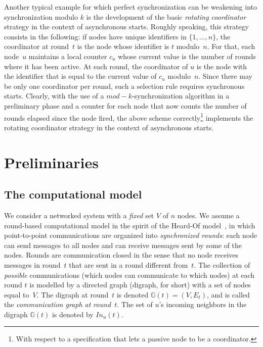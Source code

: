 \documentclass[11pt,letterpaper]{article}
\begin{document}
Another typical example for which perfect synchronization can be weakening into synchronization modulo $k$ is
	the development of the basic \emph{rotating coordinator} strategy in the context of asynchronous starts.
Roughly speaking, this strategy consists in the following: if nodes have unique identifiers in $\{1,\dots,n\}$,
	the coordinator at round~$t$ is the node whose identifier is  $t$ modulo~$n$.
For that, 	 each node~$u$ maintains a local counter $c_u$
	whose current value is the number of rounds where it has been active.
At each round, the  coordinator of $u$ is the  node with the identifier that is equal to the current value of $c_u$ modulo~$n$.
Since there may be only one coordinator per round, such a selection rule requires synchronous starts.
Clearly, with the use of a $mod-k$-synchronization algorithm in a preliminary phase and a
	counter for each node that now counts the number of rounds elapsed since the node fired, the above scheme correctly\footnote{%
	With respect to a specification that lets a passive node to be  a coordinator.}
	implements the rotating coordinator strategy in the context of asynchronous starts.

\section{Preliminaries}\label{sec:model}
 
\subsection{The computational model}
	
We consider a networked system with a {\em fixed} set $V$ of $n$ nodes.
We assume a round-based computational model  in the spirit of the Heard-Of model~\cite{CBS09}, 
	in which point-to-point communications are organized into \emph{synchronized rounds}: 
	each node can send messages  to all nodes and can receive messages sent  by some of the nodes.
Rounds are communication closed in the sense that no node receives messages in round~$t$ that are sent 
	in a round different from~$t$. 
The collection of \emph{possible} communications (which nodes can communicate to which nodes) at each round $t$
	is modelled by a directed graph (digraph, for short) with a set of nodes equal to~$V$.
The digraph at round~$t$ is  denoted $\mathds{G}(t)=(V,E_t)$, and is called the \emph{communication graph at round}~$t$. 
The set of $u$'s incoming neighbors in the digraph $\mathds{G}(t)$ is denoted by $In_u(t)$.
\end{document}
